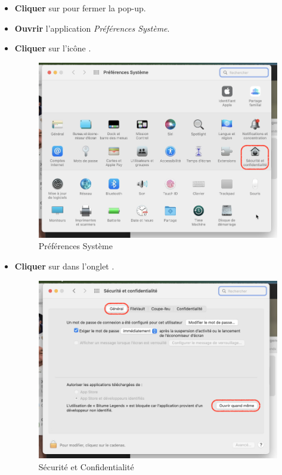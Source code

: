 \documentclass[a4paper,12pt]{article}
\begin{document}
        \begin{itemize}
            \item
                \textbf{Cliquer} sur  pour fermer la pop-up.
            \item
                \textbf{Ouvrir} l'application \textsl{Préférences Système}.
            
            \clearpage
            \item
                \textbf{Cliquer} sur l'icône .
                \begin{figure}[h]
                    \centering
                    \includegraphics[scale=0.5]{install_macos_sp.png}
                    \caption{Préférences Système}
                \end{figure}

            \clearpage
            \item
                \textbf{Cliquer} sur \; dans l'onglet
                .
                \begin{figure}[h]
                    \centering
                    \includegraphics[scale=0.5]{install_macos_security.png}
                    \caption{Sécurité et Confidentialité}
                \end{figure}


\end{itemize}
\end{document}
